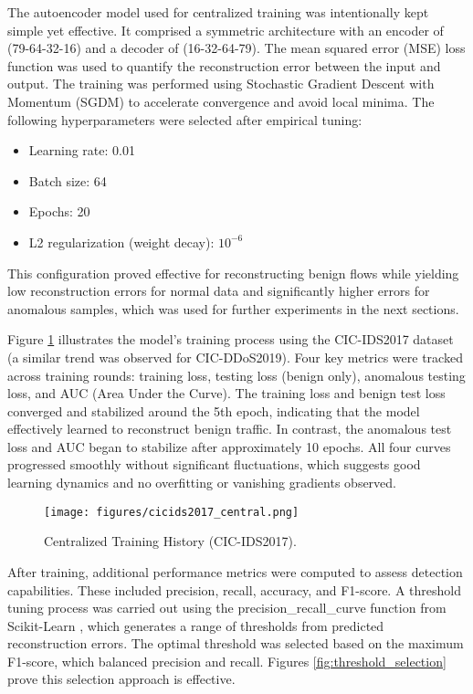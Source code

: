 The autoencoder model used for centralized training was intentionally kept simple yet effective. It comprised a symmetric architecture with an encoder of (79-64-32-16) and a decoder of (16-32-64-79). The mean squared error (MSE) loss function was used to quantify the reconstruction error between the input and output. The training was performed using Stochastic Gradient Descent with Momentum (SGDM) to accelerate convergence and avoid local minima. The following hyperparameters were selected after empirical tuning:

\begin{itemize}
    \item Learning rate: 0.01
    \item Batch size: 64
    \item Epochs: 20
    \item L2 regularization (weight decay): $10^{-6}$
\end{itemize}
 
This configuration proved effective for reconstructing benign flows while yielding low reconstruction errors for normal data and significantly higher errors for anomalous samples, which was used for further experiments in the next sections.

Figure \ref{fig:cicids2017_central} illustrates the model’s training process using the CIC-IDS2017 dataset (a similar trend was observed for CIC-DDoS2019). Four key metrics were tracked across training rounds: training loss, testing loss (benign only), anomalous testing loss, and AUC (Area Under the Curve). The training loss and benign test loss converged and stabilized around the 5th epoch, indicating that the model effectively learned to reconstruct benign traffic. In contrast, the anomalous test loss and AUC began to stabilize after approximately 10 epochs. All four curves progressed smoothly without significant fluctuations, which suggests good learning dynamics and no overfitting or vanishing gradients observed.

\begin{figure}[h]
    \centering
    \texttt{[image: figures/cicids2017\_central.png]}
    \caption{Centralized Training History (CIC-IDS2017).}
    \label{fig:cicids2017_central}
\end{figure}


After training, additional performance metrics were computed to assess detection capabilities. These included precision, recall, accuracy, and F1-score. A threshold tuning process was carried out using the precision\_recall\_curve function from Scikit-Learn \citep{sklearnprc}, which generates a range of thresholds from predicted reconstruction errors. The optimal threshold was selected based on the maximum F1-score, which balanced precision and recall. Figures \ref{fig:threshold_selection} prove this selection approach is effective.

